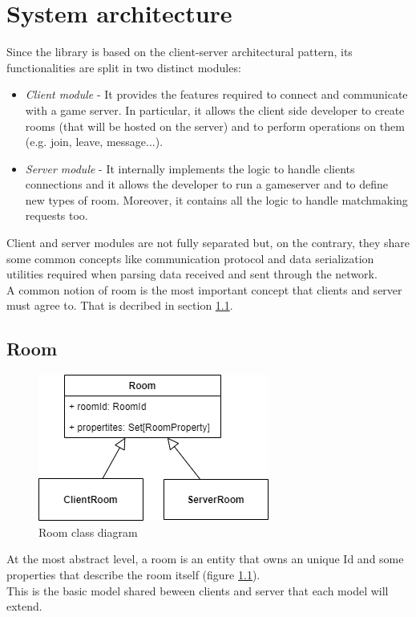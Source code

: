 \chapter{System architecture}
Since the library is based on the client-server architectural pattern, its functionalities are split in two distinct modules: 
\begin{itemize}
	\item \textit{Client module} - It provides the features required to connect and communicate with a game server. In particular, it allows the client side developer to create rooms (that will be hosted on the server) and to perform operations on them (e.g. join, leave, message...).
	\item \textit{Server module} - It internally implements the logic to handle clients connections and it allows the developer to run a gameserver and to define new types of room. Moreover, it contains all the logic to handle matchmaking requests too.
\end{itemize}

Client and server modules are not fully separated but, on the contrary, they share some common concepts like communication protocol and data serialization utilities required when parsing data received and sent through the network.
\\
A common notion of room is the most important concept that clients and server must agree to. That is decribed in section \ref{room-arch}. 

\section{Room} \label{room-arch}


\begin{figure}[H]
	\centering
	\includegraphics[scale=0.7]{images/3-architecture/room-class-3.png}
	\caption{Room class diagram}
	\label{fig:room_classes}
\end{figure}


At the most abstract level, a room is an entity that owns an unique Id and some properties that describe the room itself (figure \ref{fig:room_classes}).
\\
This is the basic model shared beween clients and server that each model will extend.

